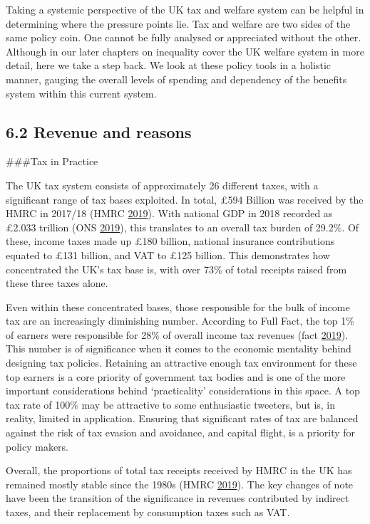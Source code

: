 \documentclass[]{article}
\begin{document}
Taking a systemic perspective of the UK tax and welfare system can be
helpful in determining where the pressure points lie. Tax and welfare
are two sides of the same policy coin. One cannot be fully analysed or
appreciated without the other. Although in our later chapters on
inequality cover the UK welfare system in more detail, here we take a
step back. We look at these policy tools in a holistic manner, gauging
the overall levels of spending and dependency of the benefits system
within this current system.

\hypertarget{revenue-and-reasons}{%
\subsection{6.2 Revenue and reasons}\label{revenue-and-reasons}}

\#\#\#Tax in Practice

The UK tax system consists of approximately 26 different taxes, with a
significant range of tax bases exploited. In total, £594 Billion was
received by the HMRC in 2017/18 (HMRC
\protect\hyperlink{ref-HMRC2019}{2019}). With national GDP in 2018
recorded as £2.033 trillion (ONS \protect\hyperlink{ref-ONS2019}{2019}),
this translates to an overall tax burden of 29.2\%. Of these, income
taxes made up £180 billion, national insurance contributions equated to
£131 billion, and VAT to £125 billion. This demonstrates how
concentrated the UK's tax base is, with over 73\% of total receipts
raised from these three taxes alone.

Even within these concentrated bases, those responsible for the bulk of
income tax are an increasingly diminishing number. According to Full
Fact, the top 1\% of earners were responsible for 28\% of overall income
tax revenues (fact \protect\hyperlink{ref-FullFact2019}{2019}). This
number is of significance when it comes to the economic mentality behind
designing tax policies. Retaining an attractive enough tax environment
for these top earners is a core priority of government tax bodies and is
one of the more important considerations behind `practicality'
considerations in this space. A top tax rate of 100\% may be attractive
to some enthusiastic tweeters, but is, in reality, limited in
application. Ensuring that significant rates of tax are balanced against
the risk of tax evasion and avoidance, and capital flight, is a priority
for policy makers.

Overall, the proportions of total tax receipts received by HMRC in the
UK has remained mostly stable since the 1980s (HMRC
\protect\hyperlink{ref-HMRC2019}{2019}). The key changes of note have
been the transition of the significance in revenues contributed by
indirect taxes, and their replacement by consumption taxes such as VAT.
\end{document}

